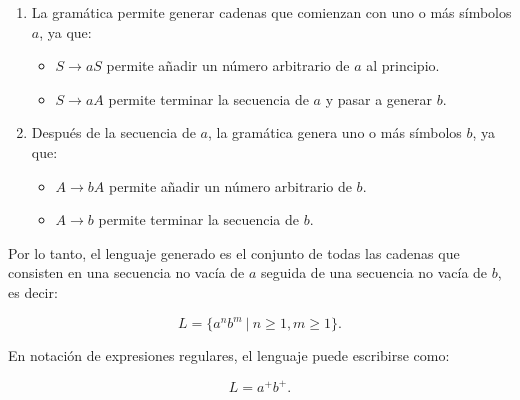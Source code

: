 \documentclass[12pt]{report} %
\begin{document}
\begin{enumerate}
\begin{solucion}[Ejercicio 2.c]
   \begin{enumerate}
       \item La gramática permite generar cadenas que comienzan con uno o más símbolos $a$, ya que:
           \begin{itemize}
               \item $S \to aS$ permite añadir un número arbitrario de $a$ al principio.
               \item $S \to aA$ permite terminar la secuencia de $a$ y pasar a generar $b$.
           \end{itemize}
       \item Después de la secuencia de $a$, la gramática genera uno o más símbolos $b$, ya que:
           \begin{itemize}
               \item $A \to bA$ permite añadir un número arbitrario de $b$.
               \item $A \to b$ permite terminar la secuencia de $b$.
           \end{itemize}
   \end{enumerate}

   Por lo tanto, el lenguaje generado es el conjunto de todas las cadenas que consisten en una secuencia no vacía de $a$ seguida de una secuencia no vacía de $b$, es decir:

   $$
   L = \{ a^n b^m \ | \ n \geq 1, m \geq 1 \}.
   $$

   En notación de expresiones regulares, el lenguaje puede escribirse como:

   $$
   L = a^+b^+.
   $$

   \end{solucion}
\end{enumerate}
\end{document}
